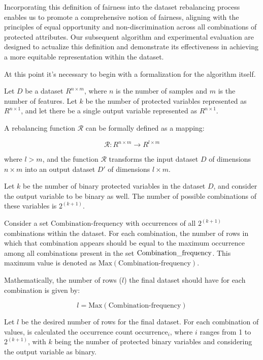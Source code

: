 \documentclass[12pt,a4paper,openright,twoside]{book}
\begin{document}
Incorporating this definition of fairness into the dataset rebalancing process enables us to promote a comprehensive notion of fairness, aligning with the principles of equal opportunity and non-discrimination across all combinations of protected attributes. Our subsequent algorithm and experimental evaluation are designed to actualize this definition and demonstrate its effectiveness in achieving a more equitable representation within the dataset.

At this point it's necessary to begin with a formalization for the algorithm itself.


Let \( D \) be a dataset \( R^{n \times m} \), where \( n \) is the number of samples and \( m \) is the number of features. Let \( k \) be the number of protected variables represented as \( R^{n \times 1} \), and let there be a single output variable represented as \( R^{n \times 1} \).

A rebalancing function \( \mathcal{R} \) can be formally defined as a mapping:

\[
\mathcal{R}: R^{n \times m} \rightarrow R^{l \times m}
\]

where \( l > m \), and the function \( \mathcal{R} \) transforms the input dataset \( D \) of dimensions \( n \times m \) into an output dataset \( D' \) of dimensions \( l \times m \).



Let \( k \) be the number of binary protected variables in the dataset \( D \), and consider the output variable to be binary as well. The number of possible combinations of these variables is \( 2^{(k+1)} \).

Consider a set \( \text{Combination-frequency} \) with occurrences of all \( 2^{(k+1)} \) combinations within the dataset. For each combination, the number of rows in which that combination appears should be equal to the maximum occurrence among all combinations present in the set \( \text{Combination\textunderscore frequency} \). This maximum value is denoted as \( \text{Max}(\text{Combination-frequency}) \).

Mathematically, the number of rows (\( l \)) the final dataset should have for each combination is given by:

\[
l = \text{Max}(\text{Combination-frequency})
\]



Let \( l \) be the desired number of rows for the final dataset. For each combination of values, is calculated the occurrence count \( \text{occurrence}_i \), where \( i \) ranges from 1 to \( 2^{(k+1)} \), with \( k \) being the number of protected binary variables and considering the output variable as binary.
\end{document}
